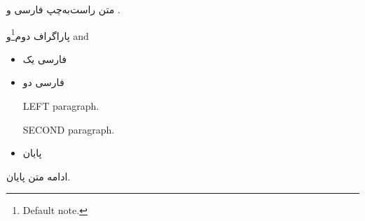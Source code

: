 \documentclass{article}
\begin{document}
متن راست‌به‌چپ فارسی و .\par
پاراگراف دوم\ifdefined\MainNormalFootnote\footnote{Default note.}\fi و and
\begin{itemize}\item فارسی یک\item فارسی دو
\begin{LTR}LEFT paragraph.\par SECOND paragraph.\end{LTR}
\item پایان\end{itemize}
\newpage
ادامه متن  پایان.
\end{document}
